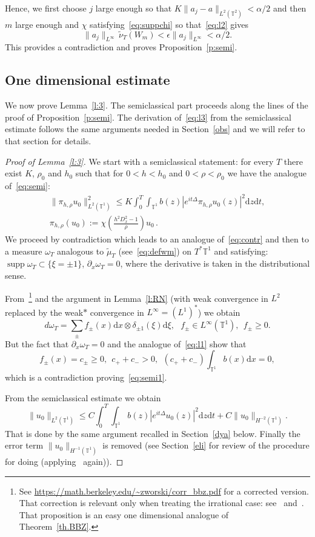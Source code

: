\documentclass[10pt]{amsart}
\theoremstyle{definition}\newtheorem{defi}[theo]{Definition}\newtheorem{rema}[theo]{Remark}\newtheorem{exam}[theo]{Example}\newtheorem{exem}[theo]{Example}\newtheorem{nota}[theo]{Notation}
\DeclareMathOperator{\supp}{supp}
\newcommand{\TT}{{\mathbb T}}
\newcommand*{\dd}{\mathrm{d}}
\newcommand*{\dx}{\dd x}
\newcommand*{\dz}{\dd z}
\newcommand*{\dt}{\dd t}
\newcommand*{\dxi}{\dd \xi}
\begin{document}
Hence, we first choose $ j $ large enough so that $ K \| a_j - a \|_{L^2 (\TT^2) } < \alpha/2 $ and then $ m $ large enough and $ \chi $ satisfying~\eqref{eq:suppchi} so that~\eqref{eq:l2} gives
\[
\| a_j \|_{ L^\infty } \, \widetilde \nu_T (W_m) <
\epsilon \| a_j \|_{ L^\infty } < \alpha/2.
\]
This provides a contradiction and proves Proposition~\ref{p:semi}.

\subsection{One dimensional estimate}\label{1D}

We now prove Lemma~\ref{l:3}. The semiclassical part proceeds along the lines of the proof of Proposition~\ref{p:semi}. The derivation of~\eqref{eq:l3} from the semiclassical estimate follows the same arguments needed in Section~\ref{obs} and we will refer to that section for details.

\begin{proof}[Proof of Lemma~\ref{l:3}]
We start with a semiclassical statement: for every $ T $ there exist $ K$, $ \rho_0 $ and $ h_0 $ such that for $ 0 < h < h_0 $ and $ 0 < \rho < \rho_0 $ we have the analogue of~\eqref{eq:semi}:
\begin{multline}\label{eq:semi1}
\| \pi_{h, \rho} u_0 \|_{ L^2 (\TT^1) }^2 \leq K \int_0^T \!\!\int_{ \TT^1}b (z) | e^{ i t \Delta} \pi_{h, \rho} u_0 (z) |^2 \dz \dt,
\\
\pi_{h, \rho} (u_0) := \chi \left(\frac{ h^2 D_x^2 - 1} {\rho} \right) u_0 \,.
\end{multline}
We proceed by contradiction which leads to an analogue of~\eqref{eq:contr} and then to a measure $ \omega_T $ analogous to $ \widetilde \mu_T $ (see~\eqref{eq:defwm}) on $ T^* \TT^1 $ and satisfying: $ \supp \omega_T \subset \{ \xi = \pm 1 \} $, $\partial_x \omega_T = 0$, where the derivative is taken in the distributional sense.

From~\cite[Proposition~2.1]{BBZ}\footnote{See \url{https://math.berkeley.edu/~zworski/corr_bbz.pdf} for a corrected version. That correction is relevant only when treating the irrational case: see~\cite{BZ4} and~\cite{BBZ}. That proposition is an easy one dimensional analogue of Theorem~\ref{th.BBZ}.} and the argument in Lemma~\ref{l:RN} (with weak convergence in $L^2 $ replaced by the weak$*$ convergence in $ L^\infty = (L^1)^* $) we obtain
\[
d \omega_T = \sum_{ \pm } f_\pm (x) \dx \otimes \delta_{\pm 1} (\xi) \dxi, \ \ \ f_\pm \in L^\infty (\TT^1), \ \ f_\pm \geq 0.
\]
But the fact that $ \partial_x \omega_T = 0 $ and the analogue of~\eqref{eq:l1} show that
\[
f_\pm (x) = c_\pm \geq 0, \ \ c_+ + c_- > 0, \ \ (c_+ + c_-)\int _{\TT^1 } b (x) \dx = 0,
\]
which is a contradiction proving~\eqref{eq:semi1}.

From the semiclassical estimate we obtain
\[
\| u_0\|_{L^2 (\TT^1) } \leq C
\int_0^T \!\!\int_{ \TT^1}b (z) | e^{ i t \Delta} u_0 (z) |^2 \dz \dt + C \| u_0 \|_{ H^{-2}(\TT^1)}.
\]
That is done by the same argument recalled in Section~\ref{dya} below. Finally the error term $ \| u_0 \|_{ H^{-1}(\TT^1) } $ is removed (see Section~\ref{eli} for review of the procedure for doing (applying~\cite[Proposition~2.1]{BBZ} again)).
\end{proof}
\end{document}
